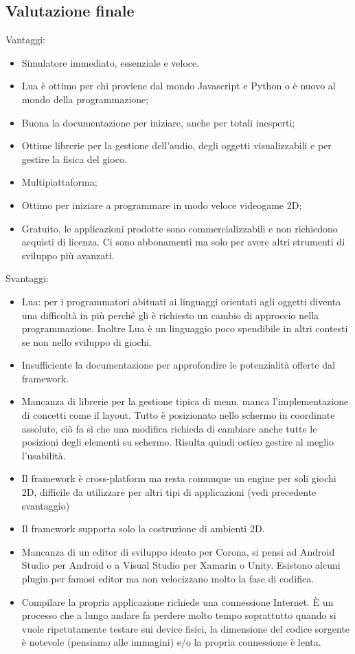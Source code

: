 	\subsection{Valutazione finale}
		Vantaggi:
		\begin{itemize}
			\item Simulatore immediato, essenziale e veloce.
			\item Lua è ottimo per chi proviene dal mondo Javascript e Python o è nuovo al mondo della programmazione;
			\item Buona la documentazione per iniziare, anche per totali inesperti;
			\item Ottime librerie per la gestione dell'audio, degli oggetti visualizzabili e per gestire la fisica del gioco.
			\item Multipiattaforma;
			\item Ottimo per iniziare a programmare in modo veloce videogame 2D;
			\item Gratuito, le applicazioni prodotte sono commercializzabili e non richiedono acquisti di licenza. Ci sono abbonamenti ma solo per avere altri strumenti di sviluppo più avanzati.
		\end{itemize}
		Svantaggi:
		\begin{itemize}
			\item Lua: per i programmatori abituati ai linguaggi orientati agli oggetti diventa una difficoltà in più perché gli è richiesto un cambio di approccio nella programmazione. Inoltre Lua è un linguaggio poco spendibile in altri contesti se non nello sviluppo di giochi.
			\item Insufficiente la documentazione per approfondire le potenzialità offerte dal framework.
			\item Mancanza di librerie per la gestione tipica di menu, manca l'implementazione di concetti come il layout. Tutto è posizionato nello schermo in coordinate assolute, ciò fa sì che una modifica richieda di cambiare anche tutte le posizioni degli elementi su schermo. Risulta quindi ostico gestire al meglio l'usabilità.
			\item Il framework è cross-platform ma resta comunque un engine per soli giochi 2D, difficile da utilizzare per altri tipi di applicazioni (vedi precedente svantaggio)
			\item Il framework supporta solo la costruzione di ambienti 2D.
			\item Mancanza di un editor di sviluppo ideato per Corona, si pensi ad Android Studio per Android o a Visual Studio per Xamarin o Unity. Esistono alcuni plugin per famosi editor ma non velocizzano molto la fase di codifica.
			\item Compilare la propria applicazione richiede una connessione Internet. È un processo che a lungo andare fa perdere molto tempo soprattutto quando si vuole ripetutamente testare sui device fisici, la dimensione del codice sorgente è notevole (pensiamo alle immagini) e/o la propria connessione è lenta.
		\end{itemize}
		
